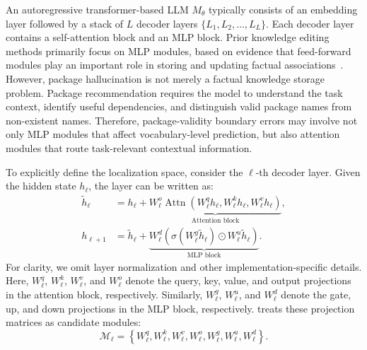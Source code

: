 An autoregressive transformer-based LLM $M_{\theta}$ typically consists of an embedding layer followed by a stack of $L$ decoder layers $\{L_1,L_2,\ldots,L_L\}$.
Each decoder layer contains a self-attention block and an MLP block.
Prior knowledge editing methods primarily focus on MLP modules, based on evidence that feed-forward modules play an important role in storing and updating factual associations~\cite{geva2021transformer,dai2022knowledge,meng2022rome,meng2023memit}.
However, package hallucination is not merely a factual knowledge storage problem.
Package recommendation requires the model to understand the task context, identify useful dependencies, and distinguish valid package names from non-existent names.
Therefore, package-validity boundary errors may involve not only MLP modules that affect vocabulary-level prediction, but also attention modules that route task-relevant contextual information.

To explicitly define the localization space, consider the $\ell$-th decoder layer. Given the hidden state $h_{\ell}$, the layer can be written as:
\begin{equation}
\begin{aligned}
    \tilde{h}_{\ell}
    &=
    h_{\ell}
    +
    \underbrace{
    W_{\ell}^{o}
    \operatorname{Attn}
    \left(
    W_{\ell}^{q} h_{\ell},
    W_{\ell}^{k} h_{\ell},
    W_{\ell}^{v} h_{\ell}
    \right)
    }_{\text{Attention block}}, \\
    h_{\ell+1}
    &=
    \tilde{h}_{\ell}
    +
    \underbrace{
    W_{\ell}^{d}
    \left(
    \sigma(W_{\ell}^{g}\tilde{h}_{\ell})
    \odot
    W_{\ell}^{u}\tilde{h}_{\ell}
    \right)
    }_{\text{MLP block}} .
\end{aligned}
\end{equation}
For clarity, we omit layer normalization and other implementation-specific details.
Here, $W_{\ell}^{q}$, $W_{\ell}^{k}$, $W_{\ell}^{v}$, and $W_{\ell}^{o}$ denote the query, key, value, and output projections in the attention block, respectively. Similarly, $W_{\ell}^{g}$, $W_{\ell}^{u}$, and $W_{\ell}^{d}$ denote the gate, up, and down projections in the MLP block, respectively. \appname treats these projection matrices as candidate modules:
\begin{equation}
    \mathcal{M}_{\ell}
    =
    \left\{
    W_{\ell}^{q},
    W_{\ell}^{k},
    W_{\ell}^{v},
    W_{\ell}^{o},
    W_{\ell}^{g},
    W_{\ell}^{u},
    W_{\ell}^{d}
    \right\}.
\end{equation}

